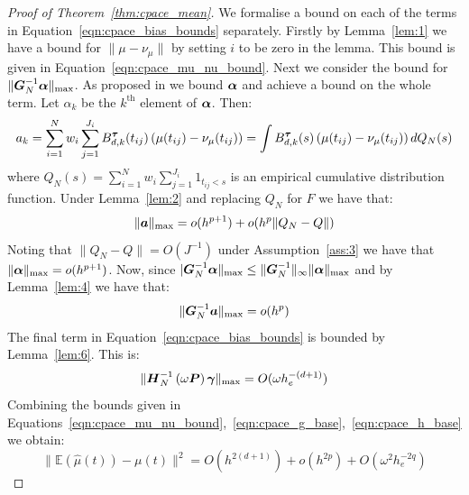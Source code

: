 \begin{proof}[Proof of Theorem~\ref{thm:cpace_mean}]
We formalise a bound on each of the terms  in Equation~\ref{eqn:cpace_bias_bounds} separately.
Firstly by Lemma~\ref{lem:1} we have a bound for $\lVert \mu - \nu_\mu \rVert$ by setting $i$ to be zero in the lemma.
This bound is given in Equation~\ref{eqn:cpace_mu_nu_bound}.
Next we consider the bound for $\lVert \bm{{G}}_{N}^{-1}\bm{{\alpha}} \rVert_\text{max}$. 
As proposed in \citep{xiao_asymptotic_2020} we bound $\bm{{\alpha}}$ and achieve a bound on the whole term. 
Let $\alpha_k$ be the $k^\text{th}$ element of $\bm{{\alpha}}$.
Then:
\begin{equation}
	a_k = \sum_{i=1}^N w_i \sum_{j=1}^{J_i} B_{d, k}^{\bm{{\tau}}}(t_{ij})\left(\mu(t_{ij})- \nu_\mu(t_{ij})\right) = \int B_{d,k}^{\bm{{\tau}}}(s)\left(\mu(t_{ij})- \nu_\mu(t_{ij})\right)  dQ_N(s)
	\label{eqn:cpace_alpha_bound}
\end{equation}
where $Q_N(s) = \sum_{i=1}^N w_i \sum_{j=1}^{J_i} 1_{t_{ij} < s}$ is an empirical cumulative distribution function.
Under Lemma~\ref{lem:2} and replacing $Q_N$ for $F$ we have that:
\begin{equation}
	\lVert \bm{{a}} \rVert_\text{max} = o(h^{p+1}) + o(h^p \lVert Q_N - Q \rVert)
\end{equation}
Noting that $\lVert Q_N - Q \rVert = O(J^{-1})$ under Assumption~\ref{ass:3} we have that $\lVert \bm{{\alpha}} \rVert_{\text{max}} = o(h^{p+1})$.
Now, since $\lvert \bm{{G}}_{N}^{-1} \bm{{\alpha}} \rVert_\text{max} \leq \lVert \bm{{G}}_{N}^{-1} \rVert_{\infty} \lVert \bm{{\alpha}} \rVert_{\text{max}}$ and by Lemma~\ref{lem:4} we have that:
\begin{equation}
	\lVert \bm{{G}}_{N}^{-1} \bm{{a}} \rVert_\text{max} = o(h^p)
	\label{eqn:cpace_g_base}
\end{equation}
The final term in Equation~\ref{eqn:cpace_bias_bounds} is bounded by Lemma~\ref{lem:6}.
This is:
\begin{equation}
	\lVert \bm{{H}}_{N}^{-1} \left(\omega \bm{{P}} \right) \bm{{\gamma}} \rVert_\text{max} = O(\omega h_e^{-(d+1)})
	\label{eqn:cpace_h_base}
\end{equation}
Combining the bounds given in Equations~\ref{eqn:cpace_mu_nu_bound},~\ref{eqn:cpace_g_base},~\ref{eqn:cpace_h_base} we obtain:
\begin{equation}
	\lVert \mathbb{E}\left(\hat{\mu}(t)\right) - \mu(t) \rVert^2  = O(h^{2(d+1)}) + o(h^{2p}) + O(\omega^2 h_e^{-2q}) 
	\label{eqn:cpace_mean_bound}
\end{equation}


\end{proof}
